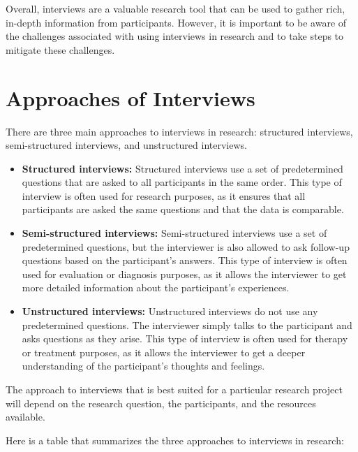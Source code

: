\documentclass[
  b5paper]{book}
\begin{document}
Overall, interviews are a valuable research tool that can be used to gather rich, in-depth information from participants. However, it is important to be aware of the challenges associated with using interviews in research and to take steps to mitigate these challenges.

\hypertarget{approaches-of-interviews}{%
\section{Approaches of Interviews}\label{approaches-of-interviews}}

There are three main approaches to interviews in research: structured interviews, semi-structured interviews, and unstructured interviews.

\begin{itemize}
\item
  \textbf{Structured interviews:} Structured interviews use a set of predetermined questions that are asked to all participants in the same order. This type of interview is often used for research purposes, as it ensures that all participants are asked the same questions and that the data is comparable.
\item
  \textbf{Semi-structured interviews:} Semi-structured interviews use a set of predetermined questions, but the interviewer is also allowed to ask follow-up questions based on the participant's answers. This type of interview is often used for evaluation or diagnosis purposes, as it allows the interviewer to get more detailed information about the participant's experiences.
\item
  \textbf{Unstructured interviews:} Unstructured interviews do not use any predetermined questions. The interviewer simply talks to the participant and asks questions as they arise. This type of interview is often used for therapy or treatment purposes, as it allows the interviewer to get a deeper understanding of the participant's thoughts and feelings.
\end{itemize}

The approach to interviews that is best suited for a particular research project will depend on the research question, the participants, and the resources available.

Here is a table that summarizes the three approaches to interviews in research:
\end{document}
